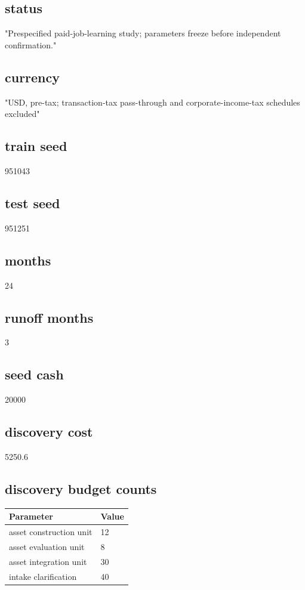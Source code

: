 \documentclass[10pt]{article}
\begin{document}
\subsection*{status}

"Prespecified paid-job-learning study; parameters freeze before independent confirmation."

\subsection*{currency}

"USD, pre-tax; transaction-tax pass-through and corporate-income-tax schedules excluded"

\subsection*{train seed}

951043

\subsection*{test seed}

951251

\subsection*{months}

24

\subsection*{runoff months}

3

\subsection*{seed cash}

20000

\subsection*{discovery cost}

5250.6

\subsection*{discovery budget counts}

\begin{longtable}{p{.44\linewidth}p{.50\linewidth}}\toprule Parameter & Value \\\midrule\endhead

asset construction unit & 12\\

asset evaluation unit & 8\\

asset integration unit & 30\\

intake clarification & 40\\

\bottomrule\end{longtable}
\end{document}
